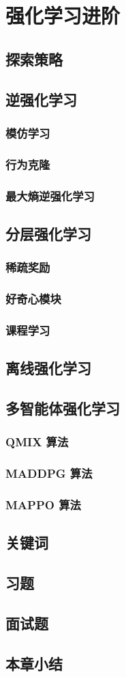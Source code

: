 
\section{强化学习进阶}
\subsection{探索策略}
\subsection{逆强化学习}
\subsubsection{模仿学习}
\subsubsection{行为克隆}
\subsubsection{最大熵逆强化学习}
\subsection{分层强化学习}
\subsubsection{稀疏奖励}
\subsubsection{好奇心模块}
\subsubsection{课程学习}
\subsection{离线强化学习}
\subsection{多智能体强化学习}
\subsubsection{ QMIX 算法}
\subsubsection{ MADDPG 算法}
\subsubsection{ MAPPO 算法}

\subsection{关键词}
\subsection{习题}
\subsection{面试题}
\subsection{本章小结}